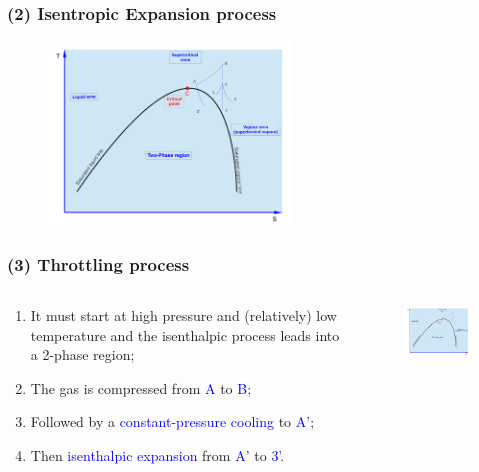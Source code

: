 \documentclass[10pt,compress]{beamer}
\begin{document}
\begin{frame}
 \frametitle{(2) Isentropic Expansion process }

    \begin{figure}%
     \begin{center}
      \includegraphics[width=6.5cm,clip]{./Pics/Overview_Refrig38}
     \end{center}
    \end{figure} 
\end{frame}


\begin{frame}
 \frametitle{(3) Throttling process}
  \begin{columns}
   \begin{column}[c]{0.45\linewidth}
  \begin{enumerate}[(1)]
   \item <1-> It must start at high pressure and (relatively) low temperature and the isenthalpic process leads into a 2-phase region;
   \item <2-> The gas is compressed from \textcolor{blue}{A} to \textcolor{blue}{B}; 
   \item <3-> Followed by a \textcolor{blue}{constant-pressure cooling} to \textcolor{blue}{A'};
   \item <4-> Then \textcolor{blue}{isenthalpic expansion} from \textcolor{blue}{A'} to \textcolor{blue}{3'}.
  \end{enumerate}
   \end{column}
   \begin{column}[c]{0.55\linewidth}
    \begin{figure}%
     \begin{center}
      \includegraphics[width=6.5cm,clip]{./Pics/Overview_Refrig38}
     \end{center}
    \end{figure}  
   \end{column}  
  \end{columns}
\end{frame}
\end{document}
